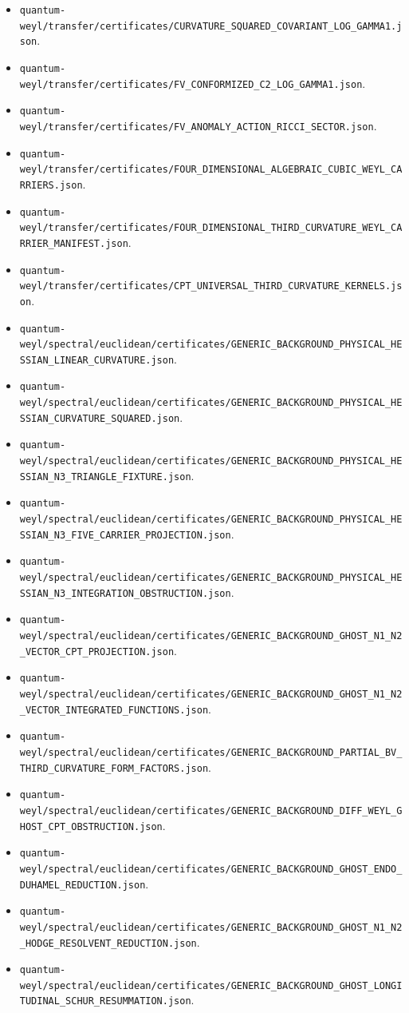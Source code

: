 \documentclass[11pt]{article}
\theoremstyle{definition}
\theoremstyle{remark}
\newcommand{\cert}[1]{\nolinkurl{#1}}
\begin{document}
\begin{itemize}
\item \cert{quantum-weyl/transfer/certificates/CURVATURE_SQUARED_COVARIANT_LOG_GAMMA1.json}.
\item \cert{quantum-weyl/transfer/certificates/FV_CONFORMIZED_C2_LOG_GAMMA1.json}.
\item \cert{quantum-weyl/transfer/certificates/FV_ANOMALY_ACTION_RICCI_SECTOR.json}.
\item \cert{quantum-weyl/transfer/certificates/FOUR_DIMENSIONAL_ALGEBRAIC_CUBIC_WEYL_CARRIERS.json}.
\item \cert{quantum-weyl/transfer/certificates/FOUR_DIMENSIONAL_THIRD_CURVATURE_WEYL_CARRIER_MANIFEST.json}.
\item \cert{quantum-weyl/transfer/certificates/CPT_UNIVERSAL_THIRD_CURVATURE_KERNELS.json}.
\item \cert{quantum-weyl/spectral/euclidean/certificates/GENERIC_BACKGROUND_PHYSICAL_HESSIAN_LINEAR_CURVATURE.json}.
\item \cert{quantum-weyl/spectral/euclidean/certificates/GENERIC_BACKGROUND_PHYSICAL_HESSIAN_CURVATURE_SQUARED.json}.
\item \cert{quantum-weyl/spectral/euclidean/certificates/GENERIC_BACKGROUND_PHYSICAL_HESSIAN_N3_TRIANGLE_FIXTURE.json}.
\item \cert{quantum-weyl/spectral/euclidean/certificates/GENERIC_BACKGROUND_PHYSICAL_HESSIAN_N3_FIVE_CARRIER_PROJECTION.json}.
\item \cert{quantum-weyl/spectral/euclidean/certificates/GENERIC_BACKGROUND_PHYSICAL_HESSIAN_N3_INTEGRATION_OBSTRUCTION.json}.
\item \cert{quantum-weyl/spectral/euclidean/certificates/GENERIC_BACKGROUND_GHOST_N1_N2_VECTOR_CPT_PROJECTION.json}.
\item \cert{quantum-weyl/spectral/euclidean/certificates/GENERIC_BACKGROUND_GHOST_N1_N2_VECTOR_INTEGRATED_FUNCTIONS.json}.
\item \cert{quantum-weyl/spectral/euclidean/certificates/GENERIC_BACKGROUND_PARTIAL_BV_THIRD_CURVATURE_FORM_FACTORS.json}.
\item \cert{quantum-weyl/spectral/euclidean/certificates/GENERIC_BACKGROUND_DIFF_WEYL_GHOST_CPT_OBSTRUCTION.json}.
\item \cert{quantum-weyl/spectral/euclidean/certificates/GENERIC_BACKGROUND_GHOST_ENDO_DUHAMEL_REDUCTION.json}.
\item \cert{quantum-weyl/spectral/euclidean/certificates/GENERIC_BACKGROUND_GHOST_N1_N2_HODGE_RESOLVENT_REDUCTION.json}.
\item \cert{quantum-weyl/spectral/euclidean/certificates/GENERIC_BACKGROUND_GHOST_LONGITUDINAL_SCHUR_RESUMMATION.json}.

\end{itemize}
\end{document}
